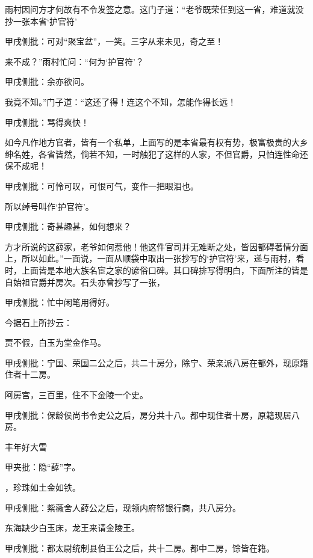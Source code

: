 \begin{parag}
    雨村因问方才何故有不令发签之意。这门子道：“老爷既荣任到这一省，难道就没抄一张本省‘护官符’\begin{note}甲戌侧批：可对“聚宝盆”，一笑。三字从来未见，奇之至！\end{note}来不成？”雨村忙问：“何为‘护官符’？\begin{note}甲戌侧批：余亦欲问。\end{note}我竟不知。”门子道：“这还了得！连这个不知，怎能作得长远！\begin{note}甲戌侧批：骂得爽快！\end{note}如今凡作地方官者，皆有一个私单，上面写的是本省最有权有势，极富极贵的大乡绅名姓，各省皆然，倘若不知，一时触犯了这样的人家，不但官爵，只怕连性命还保不成呢！\begin{note}甲戌侧批：可怜可叹，可恨可气，变作一把眼泪也。\end{note}所以绰号叫作‘护官符’。\begin{note}甲戌侧批：奇甚趣甚，如何想来？\end{note}方才所说的这薛家，老爷如何惹他！他这件官司并无难断之处，皆因都碍著情分面上，所以如此。”一面说，一面从顺袋中取出一张抄写的‘护官符’来，递与雨村，看时，上面皆是本地大族名宦之家的谚俗口碑。其口碑排写得明白，下面所注的皆是自始祖官爵并房次。石头亦曾抄写了一张，\begin{note}甲戌侧批：忙中闲笔用得好。\end{note}今据石上所抄云：
\end{parag}


\begin{poem}
    \begin{pl}贾不假，白玉为堂金作马。\end{pl}\begin{note}
        甲戌侧批：宁国、荣国二公之后，共二十房分，除宁、荣亲派八房在都外，现原籍住者十二房。
    \end{note}
    \begin{pl}阿房宫，三百里，住不下金陵一个史。\end{pl}\begin{note}
        甲戌侧批：保龄侯尚书令史公之后，房分共十八。都中现住者十房，原籍现居八房。
    \end{note}
    \begin{pl}丰年好大雪\end{pl}\begin{note}甲夹批：隐“薛”字。\end{note} \begin{pl}，珍珠如土金如铁。\end{pl} \begin{note}
        甲戌侧批：紫薇舍人薛公之后，现领内府帑银行商，共八房分。
    \end{note}

    \begin{pl}东海缺少白玉床，龙王来请金陵王。
    \end{pl}\begin{note}甲戌侧批：都太尉统制县伯王公之后，共十二房。都中二房，馀皆在籍。\end{note}

\end{poem}


